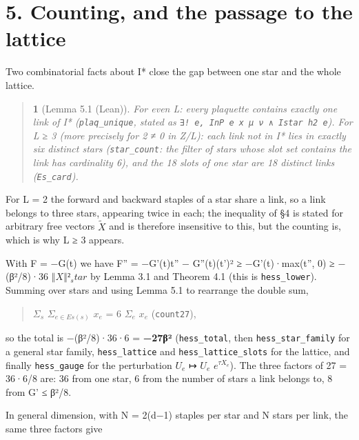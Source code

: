 \documentclass[11pt,a4paper]{article}
\theoremstyle{named}
\newtheorem*{namedthm}{}
\begin{document}
\section*{5. Counting, and the passage to the lattice}
Two combinatorial facts about I* close the gap between one star and the whole lattice.

\begin{quote}
\begin{namedthm}[Lemma 5.1 (Lean)]
For even L: every plaquette contains exactly one link of I* (\texttt{plaq\_\allowbreak{}unique}, stated as \texttt{∃!\ \allowbreak{}e,\ \allowbreak{}InP\ \allowbreak{}e\ \allowbreak{}x\ \allowbreak{}μ\ \allowbreak{}ν\ \allowbreak{}∧\ \allowbreak{}Istar\ \allowbreak{}h2\ \allowbreak{}e}). For L ≥ 3 (more precisely for 2 ≠ 0 in Z/L): each link not in I* lies in exactly six distinct stars (\texttt{star\_\allowbreak{}count}: the filter of stars whose slot set contains the link has cardinality 6), and the 18 slots of one star are 18 distinct links (\texttt{Es\_\allowbreak{}card}).
\end{namedthm}
\end{quote}
For L = 2 the forward and backward staples of a star share a link, so a link belongs to three stars, appearing twice in each; the inequality of §4 is stated for arbitrary free vectors $\tilde{X}$ and is therefore insensitive to this, but the counting is, which is why L ≥ 3 appears.

With F = −G(t) we have F'' = −G'(t)t'' − G''(t)(t')² ≥ −G'(t)·max(t'', 0) ≥ −(β²/8)·36 $‖X‖²_star$ by Lemma 3.1 and Theorem 4.1 (this is \texttt{hess\_\allowbreak{}lower}). Summing over stars and using Lemma 5.1 to rearrange the double sum,

\begin{quote}
$Σ_s$ $Σ_{e ∈ Es(s)}$ $x_e$ = 6 $Σ_e$ $x_e$   (\texttt{count27}),
\end{quote}
so the total is −(β²/8)·36·6 = \textbf{−27β²} (\texttt{hess\_\allowbreak{}total}, then \texttt{hess\_\allowbreak{}star\_\allowbreak{}family} for a general star family, \texttt{hess\_\allowbreak{}lattice} and \texttt{hess\_\allowbreak{}lattice\_\allowbreak{}slots} for the lattice, and finally \texttt{hess\_\allowbreak{}gauge} for the perturbation $U_e$ ↦ $U_e$ $e^{τX_e}$). The three factors of 27 = 36·6/8 are: 36 from one star, 6 from the number of stars a link belongs to, 8 from G' ≤ β²/8.

In general dimension, with N = 2(d−1) staples per star and N stars per link, the same three factors give
\end{document}
